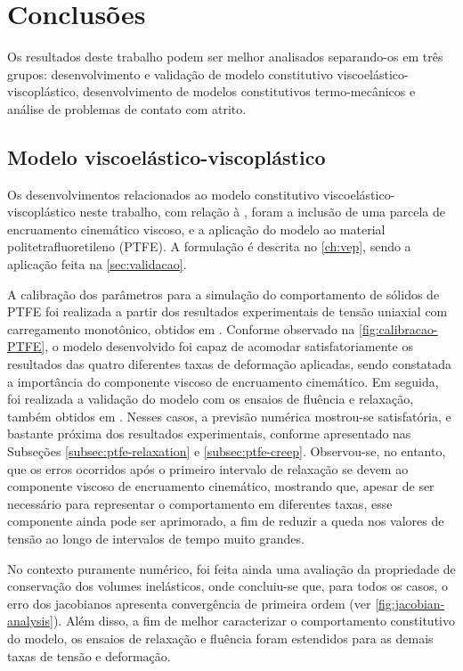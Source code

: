 \documentclass[Relatorio-FAPESP-2020.tex]{subfiles}
\begin{document}
	
\chapter{Conclusões}\label{ch:conclusoes} 

Os resultados deste trabalho podem ser melhor analisados separando-os em três grupos: desenvolvimento e validação de modelo constitutivo viscoelástico-viscoplástico, desenvolvimento de modelos constitutivos termo-mecânicos e análise de problemas de contato com atrito.

\section{Modelo viscoelástico-viscoplástico}

Os desenvolvimentos relacionados ao modelo constitutivo viscoelástico-viscoplástico neste trabalho, com relação à , foram a inclusão de uma parcela de encruamento cinemático viscoso, e a aplicação do modelo ao material politetrafluoretileno (PTFE). A formulação é descrita no \autoref{ch:vep}, sendo a aplicação feita na \autoref{sec:validacao}.

A calibração dos parâmetros para a simulação do comportamento de sólidos de PTFE foi realizada a partir dos resultados experimentais de tensão uniaxial com carregamento monotônico, obtidos em . Conforme observado na \autoref{fig:calibracao-PTFE}, o modelo desenvolvido foi capaz de acomodar satisfatoriamente os resultados das quatro diferentes taxas de deformação aplicadas, sendo constatada a importância do componente viscoso de encruamento cinemático. Em seguida, foi realizada a validação do modelo com os ensaios de fluência e relaxação, também obtidos em . Nesses casos, a previsão numérica mostrou-se satisfatória, e bastante próxima dos resultados experimentais, conforme apresentado nas Subseções \ref{subsec:ptfe-relaxation} e \ref{subsec:ptfe-creep}. Observou-se, no entanto, que os erros ocorridos após o primeiro intervalo de relaxação se devem ao componente viscoso de encruamento cinemático, mostrando que, apesar de ser necessário para representar o comportamento em diferentes taxas, esse componente ainda pode ser aprimorado, a fim de reduzir a queda nos valores de tensão ao longo de intervalos de tempo muito grandes. 

No contexto puramente numérico, foi feita ainda uma avaliação da propriedade de conservação dos volumes inelásticos, onde concluiu-se que, para todos os casos, o erro dos jacobianos apresenta convergência de primeira ordem (ver \autoref{fig:jacobian-analysis}). Além disso, a fim de melhor caracterizar o comportamento constitutivo do modelo, os ensaios de relaxação e fluência foram estendidos para as demais taxas de tensão e deformação.
\end{document}

